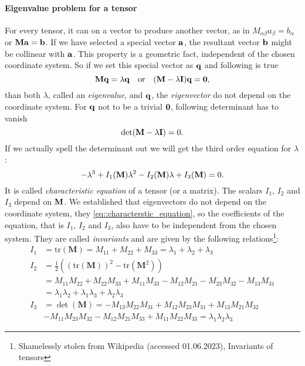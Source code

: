 \documentclass{article}
\begin{document}
\paragraph{Eigenvalue problem for a tensor}
For every tensor, it can  on a vector to produce another vector, as 
in \(M_{\alpha\beta}a_\beta = b_\alpha\) or \(\vb{M}\vb{a} = \vb{b}\). If we 
have selected a special vector \(\vb{a}\), the resultant vector \(\vb{b}\)
might be collinear with \(\vb{a}\). This property is a geometric fact, 
independent of the chosen coordinate system. So if we set this special
vector as \(\vb{q}\) and following is true
\[
  \vb{M}\vb{q} = \lambda\vb{q} \quad \text{or} \quad 
  \qty(\vb{M} - \lambda\vb{I})\vb{q} = \vb{0},
\]
than both \(\lambda\), called an \emph{eigenvalue}, and \(\vb{q}\), the 
\emph{eigenvector} do not depend on the coordinate system.
For \(\vb{q}\) not to be a trivial \(\vb{0}\), following determinant has to 
vanish
\[
  \det(\vb{M} - \lambda\vb{I}) = 0.
\]
If we actually spell the determinant out we will get the third order 
equation for \(\lambda\):
\begin{equation}\label{eq::characterstic_equation}
  -\lambda^3 + I_1 \qty(\vb{M})\lambda^2 - I_2\qty(\vb{M})\lambda 
  + I_3\qty(\vb{M}) = 0.
\end{equation}
It is called \emph{characteristic equation} of a tensor (or a matrix). The 
scalars \(I_1\), \(I_2\) and \(I_3\) depend on \(\vb{M}\). We established 
that eigenvectors do not depend on the coordinate system, they 
\autoref{eq::characterstic_equation}, so the coefficients of the equation,
that is \(I_1\), \(I_2\) and \(I_3\), also have to be independent from the 
chosen system. They are called \emph{invariants} and are given by the 
following relations\footnote{Shamelessly stolen from Wikipedia (accessed 
01.06.2023), Invariants of tensors}:
\begin{align*}
  I_1 &= \mathrm{tr}(\mathbf{M}) = M_{11}+M_{22}+M_{33} = \lambda_1+\lambda_2+\lambda_3 \\ 
  I_2 &= \frac{1}{2} \left( (\mathrm{tr}(\mathbf{M}))^2-\mathrm{tr} \left( \mathbf{M}^2 \right) \right) \\
      &= M_{11}M_{22}+M_{22}M_{33}+M_{11}M_{33}-M_{12}M_{21}-M_{23}M_{32}-M_{13}M_{31} \\
      &= \lambda_1 \lambda_2 + \lambda_1 \lambda_3 + \lambda_2 \lambda_3 \\
  I_3 &= \det (\mathbf{M}) = -M_{13} M_{22} M_{31} + M_{12} M_{23} M_{31} + M_{13} M_{21} M_{32} \\
      &- M_{11} M_{23} M_{32} - M_{12} M_{21} M_{33} +   M_{11} M_{22} M_{33} = \lambda_1 \lambda_2 \lambda_3
\end{align*}
\end{document}
